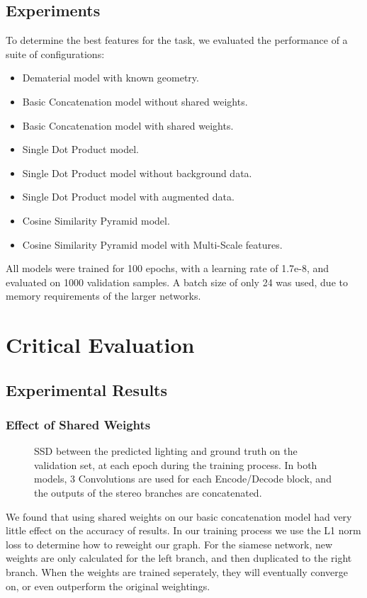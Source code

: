 \documentclass[ %
                    author={Gavin Parker},
                supervisor={Dr. Neill Campbell},
                    degree={MEng},
                     title={Deep Siamese Networks for Illumination Estimation from Stereo Images},
                  subtitle={},
                      type={Research},
                      year={2018} ]{dissertation}
\begin{document}
\section{Experiments}
To determine the best features for the task, we evaluated the performance of a suite of configurations:
\begin{itemize}
\item Dematerial model with known geometry.
\item Basic Concatenation model without shared weights.
\item Basic Concatenation model with shared weights.
\item Single Dot Product model.
\item Single Dot Product model without background data.
\item Single Dot Product model with augmented data.
\item Cosine Similarity Pyramid model.
\item Cosine Similarity Pyramid model with Multi-Scale features.
\end{itemize}
All models were trained for 100 epochs, with a learning rate of 1.7e-8, and evaluated on 1000 validation samples. A batch size of only 24 was used, due to memory requirements of the larger networks.
\chapter{Critical Evaluation}
\label{chap:evaluation}
\section{Experimental Results}
\subsection{Effect of Shared Weights}
\begin{figure}[H]
\newlength\figureheight
\newlength\figurewidth
\setlength\figureheight{6cm}
\setlength\figurewidth{12cm}
\centering

\caption{SSD between the predicted lighting and ground truth on the validation set, at each epoch during the training process. In both models, 3 Convolutions are used for each Encode/Decode block, and the outputs of the stereo branches are concatenated.}
\end{figure}
We found that using shared weights on our basic concatenation model had very little effect on the accuracy of results. In our training process we use the L1 norm loss to determine how to reweight our graph. For the siamese network, new weights are only calculated for the left branch, and then duplicated to the right branch. When the weights are trained seperately, they will eventually converge on, or even outperform the original weightings.
\end{document}
